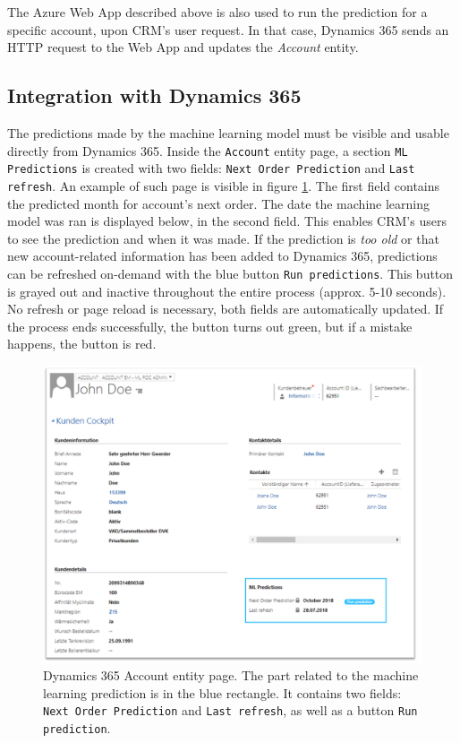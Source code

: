 The Azure Web App described above is also used to run the prediction for a specific account, upon CRM's user request. In that case, Dynamics 365 sends an HTTP request to the Web App and updates the \textit{Account} entity.

\subsection{Integration with Dynamics 365}
The predictions made by the machine learning model must be visible and usable directly from Dynamics 365. Inside the \texttt{Account} entity page, a section \texttt{ML Predictions} is created with two fields: \texttt{Next Order Prediction} and \texttt{Last refresh}. An example of such page is visible in figure \ref{fig:dynamics-account-ml-screenshot}. The first field contains the predicted month for account's next order. The date the machine learning model was ran is displayed below, in the second field. This enables CRM's users to see the prediction and when it was made. If the prediction is \textit{too old} or that new account-related information has been added to Dynamics 365, predictions can be refreshed on-demand with the blue button \texttt{Run predictions}. This button is grayed out and inactive throughout the entire process (approx. 5-10 seconds). No refresh or page reload is necessary, both fields are automatically updated. If the process ends successfully, the button turns out green, but if a mistake happens, the button is red.

\begin{figure}[!htb]
    \centering
    \includegraphics[width=12cm]{images/dynamics-account-ml-screenshot.png}
    \caption[Dynamics 365 \textit{Account} entity page]{Dynamics 365 Account entity page. The part related to the machine learning prediction is in the blue rectangle. It contains two fields: \texttt{Next Order Prediction} and \texttt{Last refresh}, as well as a button \texttt{Run prediction}.}
    \label{fig:dynamics-account-ml-screenshot}
\end{figure}


